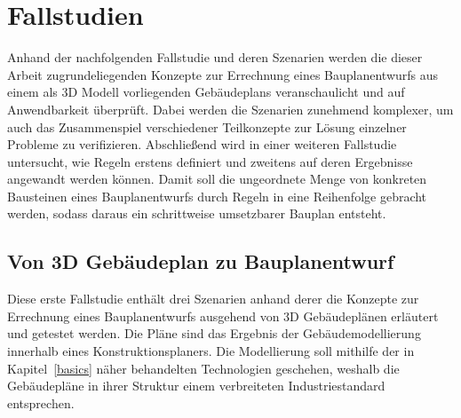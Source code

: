 \chapter{Fallstudien}\label{scenarios}
Anhand der nachfolgenden Fallstudie und deren Szenarien werden die dieser Arbeit zugrundeliegenden Konzepte zur Errechnung eines Bauplanentwurfs aus einem als 3D Modell vorliegenden Gebäudeplans veranschaulicht und auf Anwendbarkeit überprüft.
Dabei werden die Szenarien zunehmend komplexer, um auch das Zusammenspiel verschiedener Teilkonzepte zur Lösung einzelner Probleme zu verifizieren.
Abschließend wird in einer weiteren Fallstudie untersucht, wie Regeln erstens definiert und zweitens auf deren Ergebnisse angewandt werden können.
Damit soll die ungeordnete Menge von konkreten Bausteinen eines Bauplanentwurfs durch Regeln in eine Reihenfolge gebracht werden, sodass daraus ein schrittweise umsetzbarer Bauplan entsteht.

\section{Von 3D Gebäudeplan zu Bauplanentwurf}
Diese erste Fallstudie enthält drei Szenarien anhand derer die Konzepte zur Errechnung eines Bauplanentwurfs ausgehend von 3D Gebäudeplänen erläutert und getestet werden.
Die Pläne sind das Ergebnis der Gebäudemodellierung innerhalb eines Konstruktionsplaners.
Die Modellierung soll mithilfe der in Kapitel~\ref{basics} näher behandelten Technologien geschehen, weshalb die Gebäudepläne in ihrer Struktur einem verbreiteten Industriestandard entsprechen.

